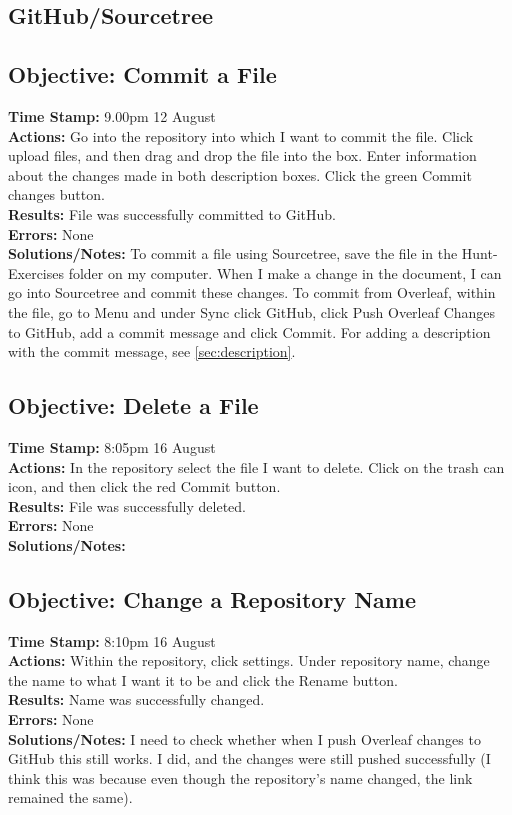 \documentclass{article}
\begin{document}
\begin{FlushLeft}
\pagebreak

\section{GitHub/Sourcetree}

\subsection{Objective: Commit a File}
\textbf{Time Stamp:} 9.00pm 12 August\\
\textbf{Actions:} Go into the repository into which I want to commit the file. Click upload files, and then drag and drop the file into the box. Enter information about the changes made in both description boxes. Click the green Commit changes button.\\
\textbf{Results:} File was successfully committed to GitHub.\\
\textbf{Errors:} None\\
\textbf{Solutions/Notes:} To commit a file using Sourcetree, save the file in the Hunt-Exercises folder on my computer. When I make a change in the document, I can go into Sourcetree and commit these changes. To commit from Overleaf, within the file, go to Menu and under Sync click GitHub, click Push Overleaf Changes to GitHub, add a commit message and click Commit. For adding a description with the commit message, see \autoref{sec:description}.

\subsection{Objective: Delete a File}
\textbf{Time Stamp:} 8:05pm 16 August\\
\textbf{Actions:} In the repository select the file I want to delete. Click on the trash can icon, and then click the red Commit button.\\
\textbf{Results:} File was successfully deleted.\\
\textbf{Errors:} None\\
\textbf{Solutions/Notes:}

\subsection{Objective: Change a Repository Name}
\textbf{Time Stamp:} 8:10pm 16 August\\
\textbf{Actions:} Within the repository, click settings. Under repository name, change the name to what I want it to be and click the Rename button.\\
\textbf{Results:} Name was successfully changed.\\
\textbf{Errors:} None\\
\textbf{Solutions/Notes:} I need to check whether when I push Overleaf changes to GitHub this still works. I did, and the changes were still pushed successfully (I think this was because even though the repository's name changed, the link remained the same).


\end{FlushLeft}
\end{document}
